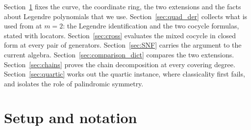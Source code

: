 \documentclass[11pt]{amsart}
\theoremstyle{definition}
\theoremstyle{remark}
\begin{document}




Section~\ref{sec:setup} fixes the curve, the coordinate ring, the two
extensions and the facts about Legendre polynomials that we use.
Section~\ref{sec:quad_der} collects what is used from \cite{CoxZhao2018} at
$m=2$: the Legendre identification and the two cocycle formulas, stated with
locators. Section~\ref{sec:cross} evaluates the mixed cocycle
in closed form at every pair of generators.
Section~\ref{sec:SNF} carries the argument to the current algebra.
Section~\ref{sec:comparison_dict} compares the two extensions.
Section~\ref{sec:chains} proves the chain decomposition at every covering
degree. Section~\ref{sec:quartic} works out the quartic instance, where
classicality first fails, and isolates the role of palindromic symmetry.

\section{Setup and notation}
\label{sec:setup}
\end{document}
